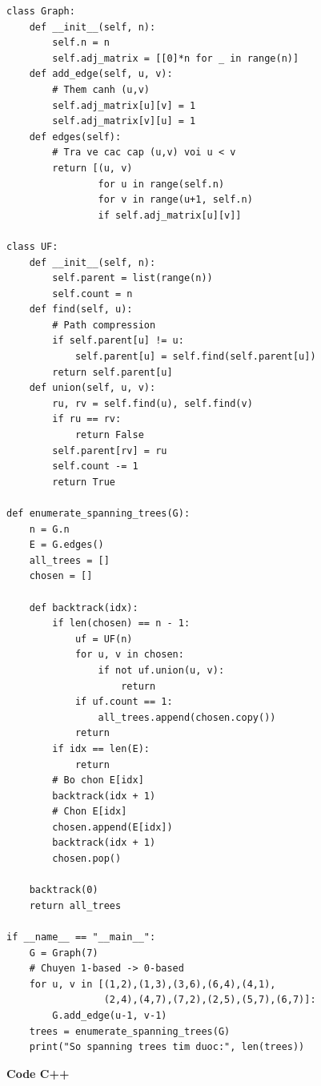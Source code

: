 \documentclass[a4paper,12pt]{article}
\begin{document}
\begin{lstlisting}
class Graph:
    def __init__(self, n):
        self.n = n
        self.adj_matrix = [[0]*n for _ in range(n)]
    def add_edge(self, u, v):
        # Them canh (u,v)
        self.adj_matrix[u][v] = 1
        self.adj_matrix[v][u] = 1
    def edges(self):
        # Tra ve cac cap (u,v) voi u < v
        return [(u, v)
                for u in range(self.n)
                for v in range(u+1, self.n)
                if self.adj_matrix[u][v]]

class UF:
    def __init__(self, n):
        self.parent = list(range(n))
        self.count = n
    def find(self, u):
        # Path compression
        if self.parent[u] != u:
            self.parent[u] = self.find(self.parent[u])
        return self.parent[u]
    def union(self, u, v):
        ru, rv = self.find(u), self.find(v)
        if ru == rv:
            return False
        self.parent[rv] = ru
        self.count -= 1
        return True

def enumerate_spanning_trees(G):
    n = G.n
    E = G.edges()
    all_trees = []
    chosen = []

    def backtrack(idx):
        if len(chosen) == n - 1:
            uf = UF(n)
            for u, v in chosen:
                if not uf.union(u, v):
                    return
            if uf.count == 1:
                all_trees.append(chosen.copy())
            return
        if idx == len(E):
            return
        # Bo chon E[idx]
        backtrack(idx + 1)
        # Chon E[idx]
        chosen.append(E[idx])
        backtrack(idx + 1)
        chosen.pop()

    backtrack(0)
    return all_trees

if __name__ == "__main__":
    G = Graph(7)
    # Chuyen 1-based -> 0-based
    for u, v in [(1,2),(1,3),(3,6),(6,4),(4,1),
                 (2,4),(4,7),(7,2),(2,5),(5,7),(6,7)]:
        G.add_edge(u-1, v-1)
    trees = enumerate_spanning_trees(G)
    print("So spanning trees tim duoc:", len(trees))
\end{lstlisting}

\textbf{Code C++}

\lstset{style=cppstyle}
\end{document}
